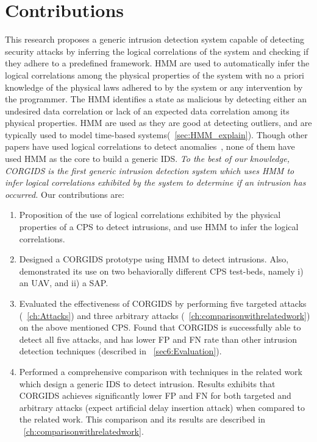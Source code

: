 \section{Contributions}
\label{sec:Contributions}

This research proposes a generic intrusion detection system capable of detecting security attacks by inferring the logical correlations of the system and checking if they adhere to a predefined framework. \ac{HMM}  are used to automatically infer the logical correlations among the physical properties of the system with no a priori knowledge of the physical laws adhered to by the system or any intervention by the programmer. The \ac{HMM} identifies a state as malicious by detecting either an undesired data correlation or lack of an expected data correlation among its physical properties. \ac{HMM} are used as they are good at detecting outliers, and are typically used to model time-based systems(~\autoref{sec:HMM_explain}).  
Though other papers have used logical correlations to detect anomalies~\cite{iturbe2017feasibility,krotofil2015process,chen2018learning,zohrevand2016hidden}, none of them have used \ac{HMM} as the core to build a generic \ac{IDS}. \textit{To the best of our knowledge, \ac{CORGIDS} is the first generic intrusion detection system which uses \ac{HMM} to infer logical correlations exhibited by the system to determine if an intrusion has occurred.} Our contributions are:

\begin{enumerate}

\item Proposition of the use of logical correlations exhibited by the physical properties of a \ac{CPS} to detect intrusions, and use \acf{HMM} to infer the logical correlations.

\item Designed a \acf{CORGIDS} prototype using \acf{HMM} to detect intrusions. Also, demonstrated its use on two behaviorally different \ac{CPS} test-beds, namely i) an \ac{UAV}, and ii) a \acf{SAP}.

\item Evaluated the effectiveness of \ac{CORGIDS} by performing five targeted attacks (~\autoref{ch:Attacks}) and three arbitrary attacks (~\autoref{ch:comparisonwithrelatedwork}) on the above mentioned \ac{CPS}. Found that \ac{CORGIDS} is successfully able to detect all five attacks, and has lower \acf{FP} and \acf{FN} rate than other intrusion detection techniques (described in ~\autoref{sec6:Evaluation}).

\item Performed a comprehensive comparison with techniques in the related work which design a generic IDS to detect intrusion. Results exhibits that \ac{CORGIDS} achieves significantly lower \ac{FP} and \ac{FN} for both targeted and arbitrary attacks (expect artificial delay insertion attack) when compared to the related work. This comparison and its results are described in ~\autoref{ch:comparisonwithrelatedwork}.


\end{enumerate}

